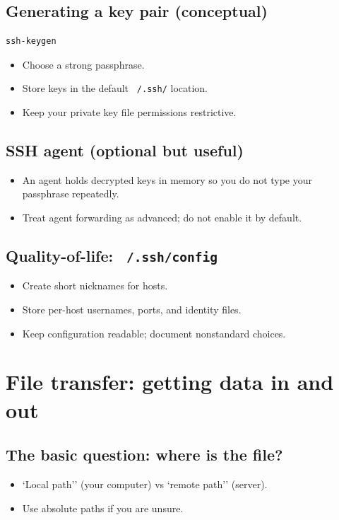 \subsection{Generating a key pair (conceptual)}
\begin{verbatim}
ssh-keygen
\end{verbatim}
\begin{itemize}
\item Choose a strong passphrase.
\item Store keys in the default \texttt{~/.ssh/} location.
\item Keep your private key file permissions restrictive.
\end{itemize}

\subsection{SSH agent (optional but useful)}
\begin{itemize}
\item An agent holds decrypted keys in memory so you do not type your passphrase repeatedly.
\item Treat agent forwarding as advanced; do not enable it by default.
\end{itemize}

\subsection{Quality-of-life: \texttt{~/.ssh/config}}
\begin{itemize}
\item Create short nicknames for hosts.
\item Store per-host usernames, ports, and identity files.
\item Keep configuration readable; document nonstandard choices.
\end{itemize}

\section{File transfer: getting data in and out}
\subsection{The basic question: where is the file?}
\begin{itemize}
\item `Local path'' (your computer) vs `remote path'' (server).
\item Use absolute paths if you are unsure.
\end{itemize}


